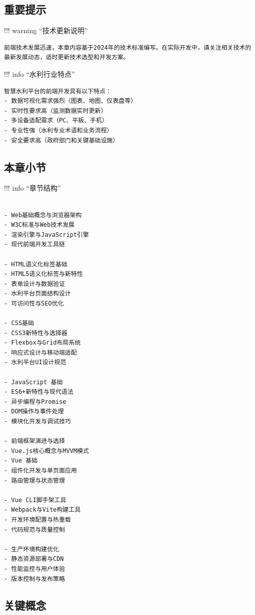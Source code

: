 \subsection{重要提示}\label{ux91cdux8981ux63d0ux793a}

!!! warning ``技术更新说明''

\begin{verbatim}
前端技术发展迅速，本章内容基于2024年的技术标准编写。在实际开发中，请关注相关技术的最新发展动态，适时更新技术选型和开发方案。
\end{verbatim}

!!! info ``水利行业特点''

\begin{verbatim}
智慧水利平台的前端开发具有以下特点：
- 数据可视化需求强烈（图表、地图、仪表盘等）
- 实时性要求高（监测数据实时更新）
- 多设备适配需求（PC、平板、手机）
- 专业性强（水利专业术语和业务流程）
- 安全要求高（政府部门和关键基础设施）
\end{verbatim}

\subsection{本章小节}\label{ux672cux7ae0ux5c0fux8282}

!!! info ``章节结构''

\begin{verbatim}

- Web基础概念与浏览器架构
- W3C标准与Web技术发展
- 渲染引擎与JavaScript引擎
- 现代前端开发工具链

- HTML语义化标签基础
- HTML5语义化标签与新特性
- 表单设计与数据验证
- 水利平台页面结构设计
- 可访问性与SEO优化

- CSS基础
- CSS3新特性与选择器
- Flexbox与Grid布局系统
- 响应式设计与移动端适配
- 水利平台UI设计规范

- JavaScript 基础
- ES6+新特性与现代语法
- 异步编程与Promise
- DOM操作与事件处理
- 模块化开发与调试技巧

- 前端框架演进与选择
- Vue.js核心概念与MVVM模式
- Vue 基础
- 组件化开发与单页面应用
- 路由管理与状态管理

- Vue CLI脚手架工具
- Webpack与Vite构建工具
- 开发环境配置与热重载
- 代码规范与质量控制

- 生产环境构建优化
- 静态资源部署与CDN
- 性能监控与用户体验
- 版本控制与发布策略
\end{verbatim}

\subsection{关键概念}\label{ux5173ux952eux6982ux5ff5}

